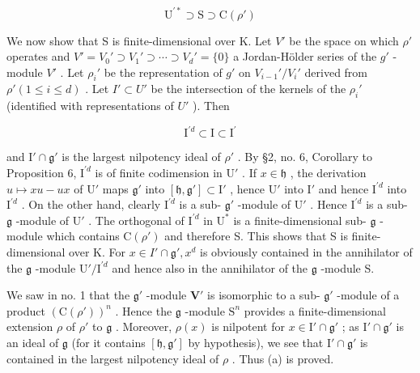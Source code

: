 \[
\mathrm{U}^{\prime *} \supset \mathrm{S} \supset \mathrm{C}(\rho')
\]

We now show that S is finite-dimensional over K. Let \(V'\) be the space on which \(\rho'\) operates and \(V' = V_{0}' \supset V_{1}' \supset \cdots \supset V_{d}' = \{0\}\) a Jordan-Hölder series of the \(g'\) -module \(V'\) . Let \(\rho_{i}'\) be the representation of \(g'\) on \(V_{i-1}'/V_{i}'\) derived from \(\rho' (1 \leqslant i \leqslant d)\) . Let \(I' \subset U'\) be the intersection of the kernels of the \(\rho_{i}'\) (identified with representations of \(U'\) ). Then

\[
\mathrm{I} ^ {\prime d} \subset \mathrm{I} \subset \mathrm{I} ^ {\prime}
\]

and \(\mathrm{I}'\cap \mathfrak{g}'\) is the largest nilpotency ideal of \(\rho'\) . By §2, no. 6, Corollary to Proposition 6, \(\mathrm{I}^{\prime d}\) is of finite codimension in \(\mathrm{U}'\) . If \(x\in \mathfrak{h}\) , the derivation \(u\mapsto xu - ux\) of \(\mathrm{U}'\) maps \(\mathfrak{g}'\) into \([\mathfrak{h},\mathfrak{g}']\subset \mathrm{I}'\) , hence \(\mathrm{U}'\) into \(\mathrm{I}'\) and hence \(\mathrm{I}^{\prime d}\) into \(\mathrm{I}^{\prime d}\) . On the other hand, clearly \(\mathrm{I}^{\prime d}\) is a sub- \(\mathfrak{g}'\) -module of \(\mathrm{U}'\) . Hence \(\mathrm{I}^{\prime d}\) is a sub- \(\mathfrak{g}\) -module of \(\mathrm{U}'\) . The orthogonal of \(\mathrm{I}^{\prime d}\) in \(\mathrm{U}^*\) is a finite-dimensional sub- \(\mathfrak{g}\) -module which contains \(\mathrm{C}(\rho')\) and therefore S. This shows that S is finite-dimensional over K. For \(x\in I'\cap \mathfrak{g}', x^d\) is obviously contained in the annihilator of the \(\mathfrak{g}\) -module \(\mathrm{U}' / \mathrm{I}^{\prime d}\) and hence also in the annihilator of the \(\mathfrak{g}\) -module S.

We saw in no. 1 that the \(\mathfrak{g}'\) -module \(\mathbf{V}'\) is isomorphic to a sub- \(\mathfrak{g}'\) -module of a product \((\mathrm{C}(\rho'))^n\) . Hence the \(\mathfrak{g}\) -module \(\mathrm{S}^n\) provides a finite-dimensional extension \(\rho\) of \(\rho'\) to \(\mathfrak{g}\) . Moreover, \(\rho(x)\) is nilpotent for \(x \in \mathrm{I}' \cap \mathfrak{g}'\) ; as \(\mathrm{I}' \cap \mathfrak{g}'\) is an ideal of \(\mathfrak{g}\) (for it contains \([\mathfrak{h},\mathfrak{g}']\) by hypothesis), we see that \(\mathrm{I}'\cap \mathfrak{g}'\) is contained in the largest nilpotency ideal of \(\rho\) . Thus (a) is proved.

